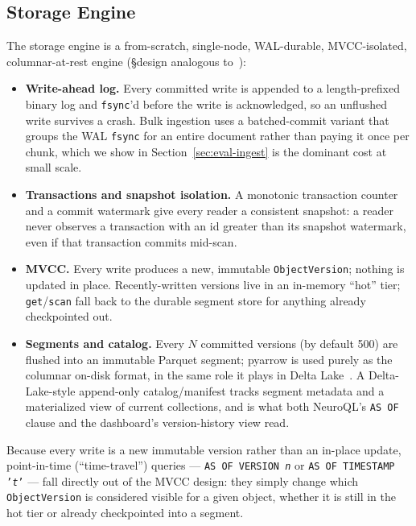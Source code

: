 \documentclass[conference]{IEEEtran}
\begin{document}
\subsection{Storage Engine}
\label{sec:storage}

The storage engine is a from-scratch, single-node, WAL-durable, MVCC-isolated, columnar-at-rest
engine (\S design analogous to~\cite{bernstein1981concurrency,armbrust2020deltalake}):

\begin{itemize}
  \item \textbf{Write-ahead log.} Every committed write is appended to a length-prefixed
    binary log and \texttt{fsync}'d before the write is acknowledged, so an unflushed write
    survives a crash. Bulk ingestion uses a batched-commit variant that groups the WAL
    \texttt{fsync} for an entire document rather than paying it once per chunk, which we
    show in Section~\ref{sec:eval-ingest} is the dominant cost at small scale.
  \item \textbf{Transactions and snapshot isolation.} A monotonic transaction counter and a
    commit watermark give every reader a consistent snapshot: a reader never observes a
    transaction with an id greater than its snapshot watermark, even if that transaction
    commits mid-scan.
  \item \textbf{MVCC.} Every write produces a new, immutable \texttt{ObjectVersion}; nothing
    is updated in place. Recently-written versions live in an in-memory ``hot'' tier;
    \texttt{get}/\texttt{scan} fall back to the durable segment store for anything already
    checkpointed out.
  \item \textbf{Segments and catalog.} Every $N$ committed versions (by default 500) are
    flushed into an immutable Parquet segment; pyarrow is used purely as the columnar
    on-disk format, in the same role it plays in Delta Lake~\cite{armbrust2020deltalake}. A
    Delta-Lake-style append-only catalog/manifest tracks segment metadata and a
    materialized view of current collections, and is what both NeuroQL's \texttt{AS OF}
    clause and the dashboard's version-history view read.
\end{itemize}

Because every write is a new immutable version rather than an in-place update, point-in-time
(``time-travel'') queries --- \texttt{AS OF VERSION \textit{n}} or
\texttt{AS OF TIMESTAMP '\textit{t}'} --- fall directly out of the MVCC design: they simply
change which \texttt{ObjectVersion} is considered visible for a given object, whether it is
still in the hot tier or already checkpointed into a segment.
\end{document}
